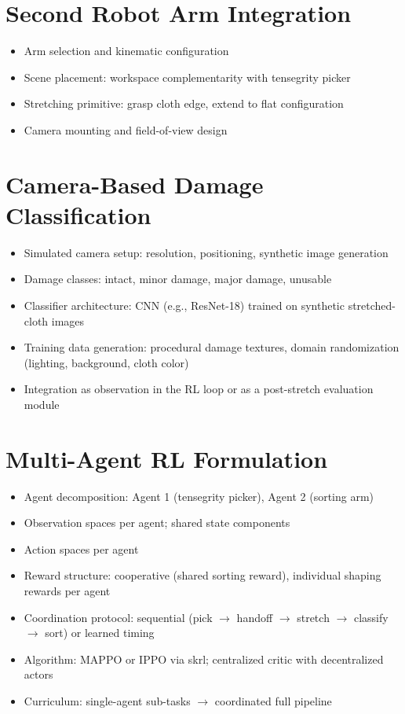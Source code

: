 \section{Second Robot Arm Integration}
\begin{itemize}
    \item Arm selection and kinematic configuration
    \item Scene placement: workspace complementarity with tensegrity picker
    \item Stretching primitive: grasp cloth edge, extend to flat configuration
    \item Camera mounting and field-of-view design
\end{itemize}

\section{Camera-Based Damage Classification}
\begin{itemize}
    \item Simulated camera setup: resolution, positioning, synthetic image generation
    \item Damage classes: intact, minor damage, major damage, unusable
    \item Classifier architecture: CNN (e.g., ResNet-18) trained on synthetic stretched-cloth images
    \item Training data generation: procedural damage textures, domain randomization (lighting, background, cloth color)
    \item Integration as observation in the RL loop or as a post-stretch evaluation module
\end{itemize}

\section{Multi-Agent RL Formulation}
\begin{itemize}
    \item Agent decomposition: Agent 1 (tensegrity picker), Agent 2 (sorting arm)
    \item Observation spaces per agent; shared state components
    \item Action spaces per agent
    \item Reward structure: cooperative (shared sorting reward), individual shaping rewards per agent
    \item Coordination protocol: sequential (pick $\rightarrow$ handoff $\rightarrow$ stretch $\rightarrow$ classify $\rightarrow$ sort) or learned timing
    \item Algorithm: MAPPO or IPPO via skrl; centralized critic with decentralized actors
    \item Curriculum: single-agent sub-tasks $\rightarrow$ coordinated full pipeline
\end{itemize}

